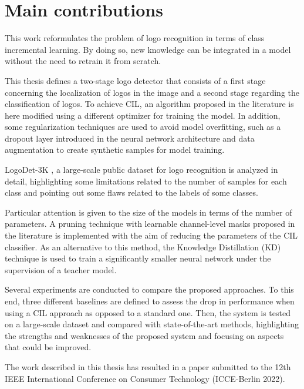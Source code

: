 \section{Main contributions}
This work reformulates the problem of logo recognition in terms of class incremental learning. By doing so, new knowledge can be integrated in a model without the need to retrain it from scratch.

This thesis defines a two-stage logo detector that consists of a first stage concerning the localization of logos in the image and a second stage regarding the classification of logos. 
To achieve CIL, an algorithm proposed in the literature is here modified using a different optimizer for training the model. In addition, some regularization techniques are used to avoid model overfitting, such as a dropout layer introduced in the neural network architecture and data augmentation to create synthetic samples for model training.

LogoDet-3K \cite{wang2022logodet}, a large-scale public dataset for logo recognition is analyzed in detail, highlighting some limitations related to the number of samples for each class and pointing out some flaws related to the labels of some classes.

Particular attention is given to the size of the models in terms of the number of parameters. A pruning technique with learnable channel-level masks proposed in the literature is implemented with the aim of reducing the parameters of the CIL classifier.
As an alternative to this method, the Knowledge Distillation (KD) technique is used to train a significantly smaller neural network under the supervision of a teacher model.

Several experiments are conducted to compare the proposed approaches. To this end, three different baselines are defined to assess the drop in performance when using a CIL approach as opposed to a standard one. Then, the system is tested on a large-scale dataset and compared with state-of-the-art methods, highlighting the strengths and weaknesses of the proposed system and focusing on aspects that could be improved.

The work described in this thesis has resulted in a paper submitted to the 12th IEEE International Conference on Consumer Technology (ICCE-Berlin 2022).


